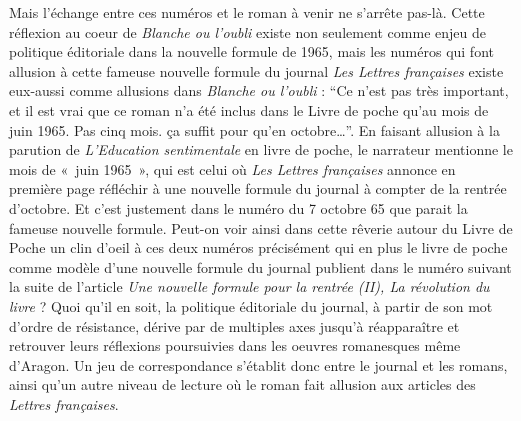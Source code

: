 Mais l’échange entre ces numéros et le roman à venir ne s’arrête pas-là. Cette réflexion au coeur de \emph{Blanche ou l’oubli} existe non seulement comme enjeu de politique éditoriale dans la nouvelle formule de 1965, mais les numéros qui font allusion à cette fameuse nouvelle formule du journal \emph{Les Lettres françaises} existe eux-aussi comme allusions dans \emph{Blanche ou l’oubli} : \enquote{Ce n’est pas très important, et il est vrai que ce roman n’a été inclus dans le Livre de poche qu’au mois de juin 1965. Pas cinq mois. ça suffit pour qu’en octobre…}. En faisant allusion à la parution de \emph{L’Education sentimentale} en livre de poche, le narrateur mentionne le mois de « juin 1965 », qui est celui où \emph{Les Lettres françaises} annonce en première page réfléchir à une nouvelle formule du journal à compter de la rentrée d’octobre. Et c’est justement dans le numéro du 7 octobre 65 que parait la fameuse nouvelle formule. Peut-on voir ainsi dans cette rêverie autour du Livre de Poche un clin d’oeil à ces deux numéros précisément qui en plus le livre de poche comme modèle d’une nouvelle formule du journal publient dans le numéro suivant la suite de l’article \emph{Une nouvelle formule pour la rentrée (II), La révolution du livre }? Quoi qu’il en soit, la politique éditoriale du journal, à partir de son mot d’ordre de résistance, dérive par de multiples axes jusqu’à réapparaître et retrouver leurs réflexions poursuivies dans les oeuvres romanesques même d’Aragon. Un jeu de correspondance s’établit donc entre le journal et les romans, ainsi qu’un autre niveau de lecture où le roman fait allusion aux articles des \emph{Lettres françaises}. 



